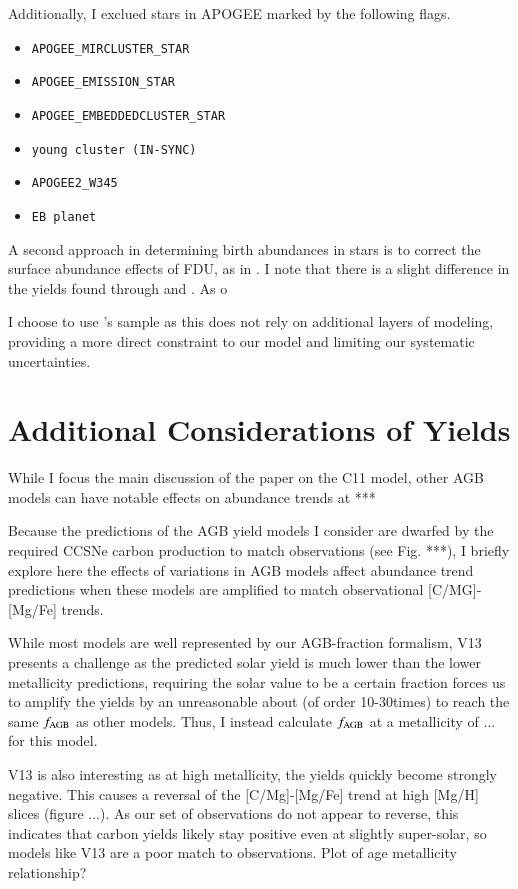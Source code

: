 \documentclass[12pt,oneside]{report}
\begin{document}
Additionally, I exclued stars in APOGEE marked by the following flags.
\begin{itemize}
\item \verb|APOGEE_MIRCLUSTER_STAR|
\item \verb|APOGEE_EMISSION_STAR|
\item \verb|APOGEE_EMBEDDEDCLUSTER_STAR|
\item \verb|young cluster (IN-SYNC)|
\item \verb|APOGEE2_W345|
\item \verb|EB planet|
\end{itemize}

A second approach in determining birth abundances in stars is to correct the surface abundance effects of FDU, as in \cite{fiorenzo+21}. I note that there is a slight difference in the yields found through \cite{fiorenzo+21} and \cite{jack_subgiant}. As o

I choose to use \cite{jack_subgiant}'s sample as this does not rely on additional layers of modeling, providing a more direct constraint to our model and limiting our systematic uncertainties.

\newpage
\section{Additional Considerations of Yields}\label{sec:alt_agb}


While I focus the main discussion of the paper on the C11 model, other AGB models can have notable effects on abundance trends at ***

Because the predictions of the AGB yield models I consider are dwarfed by the
required CCSNe carbon production to match observations (see Fig. ***), I briefly explore here the effects of variations in AGB models affect abundance trend predictions when these models are amplified to match observational [C/MG]-[Mg/Fe] trends. 

While most models are well represented by our AGB-fraction formalism, V13 presents a challenge as the predicted solar yield is much lower than the lower metallicity predictions, requiring the solar value to be a certain fraction forces us to amplify the yields by an unreasonable about (of order 10-30times) to reach the same $f_{\rm AGB}$ as other models. Thus, I instead calculate $f_{\rm AGB}$ at a metallicity of ... for this model. 

V13 is also interesting as at high metallicity, the yields quickly become strongly negative. This causes a reversal of the [C/Mg]-[Mg/Fe] trend at high [Mg/H] slices (figure ...). As our set of observations do not appear to reverse, this indicates that carbon yields likely stay positive even at slightly super-solar, so models like V13 are a poor match to observations. 
Plot of age metallicity relationship?
\end{document}
